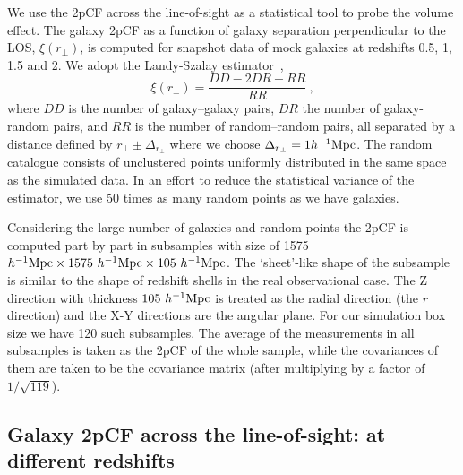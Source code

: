 \documentclass[iop]{emulateapj}
\begin{document}

We use the 2pCF across the line-of-sight as a statistical tool to probe the volume effect.
The galaxy 2pCF as a function of galaxy separation perpendicular to the LOS, $\xi(r_\perp)$, is computed for snapshot data of mock galaxies at redshifts 0.5, 1, 1.5 and 2.
We adopt the Landy-Szalay estimator~\citep{1993ApJ...412...64L},
\begin{equation}
\xi(r_\perp)=\frac{DD-2DR+RR}{RR}\ ,
\end{equation}
where $DD$ is the number of galaxy--galaxy pairs, 
$DR$ the number of galaxy-random pairs, 
and $RR$ is the number of random--random pairs, 
all separated by a distance defined by $r_\perp\pm\Delta_{r_\perp}$ where we choose $\Delta_{r_\perp}=1h^{-1}\rm Mpc$.
The random catalogue consists of unclustered points uniformly distributed in the same space as the simulated data. 
In an effort to reduce the statistical variance of the estimator, we use 50 times as many random points as we have galaxies.

Considering the large number of galaxies and random points the 2pCF is computed part by part in subsamples with 
size of 1575 $h^{-1}{\rm Mpc}\times 1575\ h^{-1}{\rm Mpc}\times 105\ h^{-1}{\rm Mpc}$.
The `sheet'-like shape of the subsample is similar to the shape of redshift shells in the real observational case.
The Z direction with thickness $105\ h^{-1}\rm Mpc$ is treated as the radial direction (the $r$ direction) 
and the X-Y directions %
are the angular plane.
For our simulation box size we have 120 such subsamples.
The average of the measurements in all subsamples is taken as the 2pCF of the whole sample,
while the covariances of them are taken to be the covariance matrix (after multiplying by a factor of $1/\sqrt{119}$).


\subsection{Galaxy 2pCF across the line-of-sight: at different redshifts}\label{sec_2pCF_diffz}
\end{document}
